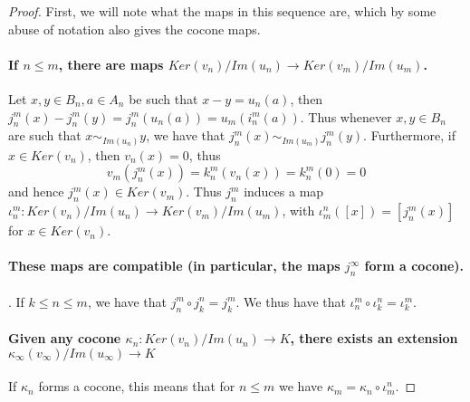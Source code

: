\begin{proof}
  First, we will note what the maps in this sequence are, which by some abuse of notation also gives
  the cocone maps. 
\paragraph{If $n\leq m$, there are maps $Ker(v_n)/Im(u_n)\to Ker(v_m) / Im(u_m)$.}
Let $x,y\in B_n, a \in A_n$ be such that $x - y  = u_n(a)$, 
then $j_n^m(x) - j_n^m(y) = j_n^m(u_n(a)) = u_m(i_n^m(a))$.
Thus whenever $x,y\in B_n$ are such that $x \sim_{Im(u_n)} y$, we have that 
$j_n^m(x) \sim_{Im(u_m)} j_n^m(y)$. 
%
%
Furthermore, if $x\in Ker(v_n)$, then $v_n(x) = 0$, thus 
\begin{equation}
  v_m(j_n^m(x)) = k_n^m(v_n(x)) = k_n^m(0) = 0
\end{equation} 
and hence $j_n^m(x) \in Ker(v_m)$. 
Thus $j_n^m$ induces a map $\iota_n^m:Ker(v_n)/Im(u_n) \to Ker(v_m)/Im(u_m)$, 
with $\iota^n_m([x]) = [j_n^m(x)]$ for $x\in Ker(v_n)$. 

\paragraph{These maps are compatible (in particular, the maps $j_n^\infty$ form a cocone).}. 
If $k\leq n \leq m$, we have that $j_n^m \circ j_k^n = j_k^m$.
We thus have that $\iota_n^m \circ \iota_k^n = \iota_k^m$.

\paragraph{Given any cocone $\kappa_n : Ker(v_n)/Im(u_n)\to K$, 
  there exists an extension $\kappa_\infty(v_\infty)/Im(u_\infty)\to K$}
      If $\kappa_n$ forms a cocone, this means that for $n\leq m$ we have 
      $\kappa_m = \kappa_n \circ \iota_m^n$.


\end{proof}
